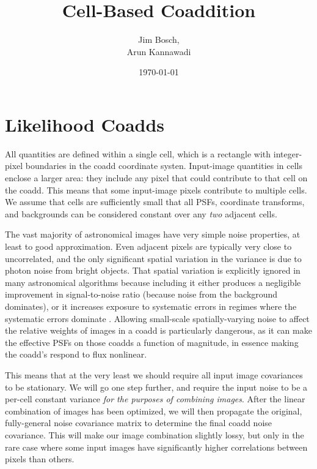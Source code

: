 \documentclass[DM,authoryear,toc]{lsstdoc}
\title{Cell-Based Coaddition}
\author{%
Jim Bosch, \\
Arun Kannawadi
}
\date{\today}
\begin{document}
\maketitle

\section{Likelihood Coadds}

All quantities are defined within a single cell, which is a rectangle with integer-pixel boundaries in the coadd coordinate systen.
Input-image quantities in cells enclose a larger area: they include any pixel that could contribute to that cell on the coadd.
This means that some input-image pixels contribute to multiple cells.
We assume that cells are sufficiently small that all PSFs, coordinate transforms, and backgrounds can be considered constant over any \emph{two} adjacent cells.

The vast majority of astronomical images have very simple noise properties, at least to good approximation.
Even adjacent pixels are typically very close to uncorrelated, and the only significant spatial variation in the variance is due to photon noise from bright objects.
That spatial variation is explicitly ignored in many astronomical algorithms because including it either produces a negligible improvement in signal-to-noise ratio (because noise from the background dominates), or it increases exposure to systematic errors in regimes where the systematic errors dominate \citep[e.g. PSF photometry of bright stars;][]{2018PASJ...70S...5B}.
Allowing small-scale spatially-varying noise to affect the relative weights of images in a coadd is particularly dangerous, as it can make the effective PSFs on those coadds a function of magnitude, in essence making the coadd's respond to flux nonlinear.

This means that at the very least we should require all input image covariances to be stationary.
We will go one step further, and require the input noise to be a per-cell constant variance \emph{for the purposes of combining images}.
After the linear combination of images has been optimized, we will then propagate the original, fully-general noise covariance matrix to determine the final coadd noise covariance.
This will make our image combination slightly lossy, but only in the rare case where some input images have significantly higher correlations between pixels than others.
\end{document}
